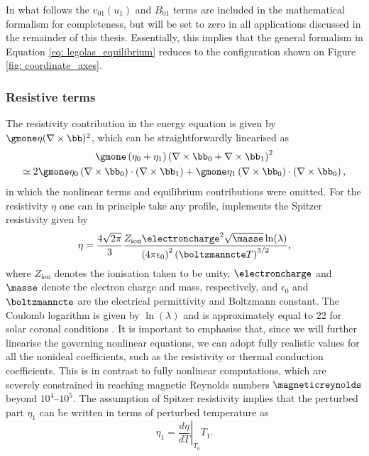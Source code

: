 In what follows the $v_{01}(u_1)$ and $B_{01}$ terms are included in the mathematical formalism for completeness, but will be set to zero in all applications discussed in the remainder of this thesis. Essentially, this implies that the general formalism in Equation \eqref{eq: legolas_equilibrium} reduces to the configuration shown on Figure \ref{fig: coordinate_axes}.

\subsubsection{Resistive terms}
The resistivity contribution in the energy equation is given by $\gmone \eta (\nabla \times \bb)^2$, which can be straightforwardly linearised as
\begin{equation}
  \begin{gathered}
    \gmone\left(\eta_0 + \eta_1\right)\left(\nabla \times \bb_0 + \nabla \times \bb_1\right)^2 \\
    \simeq 2\gmone \eta_0 \left(\nabla \times \bb_0\right) \cdot \left(\nabla \times \bb_1\right)
      + \gmone\eta_1 \left(\nabla \times \bb_0\right) \cdot \left(\nabla \times \bb_0\right),
  \end{gathered}
\end{equation}
in which the nonlinear terms and equilibrium contributions were omitted. For the resistivity $\eta$ one can in principle take any profile, {\legolas} implements the Spitzer resistivity given by
\begin{equation} \label{eq: spitzer_eta}
  \eta = \frac{4\sqrt{2\pi}}{3}\frac{
    Z_\text{ion} \electroncharge^2 \sqrt{\masse} \ln(\lambda)
  }{
    \left(4\pi\epsilon_0\right)^2\left(\boltzmanncte T\right)^{3/2}
  },
\end{equation}
where $Z_\text{ion}$ denotes the ionisation taken to be unity, $\electroncharge$ and $\masse$ denote the electron charge and mass, respectively, and $\epsilon_0$ and $\boltzmanncte$ are the electrical permittivity and Boltzmann constant. The Coulomb logarithm is given by $\ln(\lambda)$ and is approximately equal to 22 for solar coronal conditions \citep{book_MHD}. It is important to emphasise that, since we will further linearise the governing nonlinear equations, we can adopt fully realistic values for all the nonideal coefficients, such as the resistivity or thermal conduction coefficients. This is in contrast to fully nonlinear computations, which are severely constrained in reaching magnetic Reynolds numbers $\magneticreynolds$ beyond $10^4$--$10^5$. The assumption of Spitzer resistivity implies that the perturbed part $\eta_1$ can be written in terms of perturbed temperature as
\begin{equation}
  \eta_1 = \left.\frac{d\eta}{dT}\right|_{T_0}T_1.
\end{equation}

